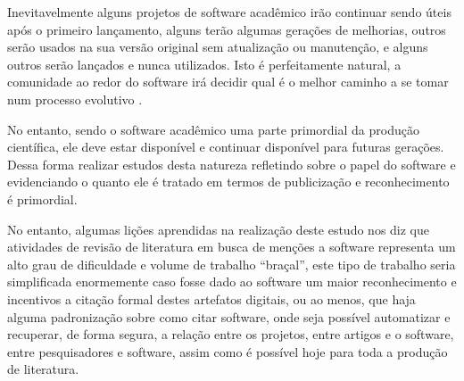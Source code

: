 %

Inevitavelmente alguns projetos de software acadêmico irão continuar sendo
úteis após o primeiro lançamento, alguns terão algumas gerações de melhorias,
outros serão usados na sua versão original sem atualização ou manutenção, e
alguns outros serão lançados e nunca utilizados. Isto é perfeitamente natural,
a comunidade ao redor do software irá decidir qual é o melhor caminho a se
tomar num processo evolutivo \cite{weiner2009astronomical}.

No entanto, sendo o software acadêmico uma parte primordial da produção
científica, ele deve estar disponível e continuar disponível para futuras
gerações. Dessa forma realizar estudos desta natureza refletindo sobre
o papel do software e evidenciando o quanto ele é tratado em termos
de publicização e reconhecimento é primordial.

No entanto, algumas lições aprendidas na realização deste estudo nos diz que
atividades de revisão de literatura em busca de menções a software representa
um alto grau de dificuldade e volume de trabalho ``braçal'', este tipo de trabalho seria
simplificada enormemente caso fosse dado ao software um maior reconhecimento e
incentivos a citação formal destes artefatos digitais, ou ao menos, que haja
alguma padronização sobre como citar software, onde seja possível automatizar e
recuperar, de forma segura, a relação entre os projetos, entre artigos e o
software, entre pesquisadores e software, assim como é possível hoje para toda
a produção de literatura.



